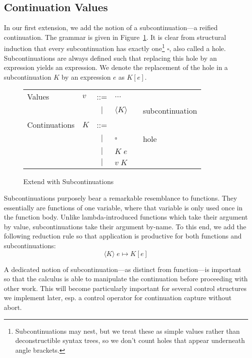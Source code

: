 \documentclass[11pt]{article}
\newcommand{\maybePage}{\newpage}
\newcommand{\angles}[1]{\langle#1\rangle}
\begin{document}
\maybePage
\subsection{Continuation Values}

In our first extension, we add the notion of a subcontinuation---a reified continuation.
The grammar is given in Figure~\ref{fig:addSubconts}.
It is clear from structural induction that every subcontinuation has exactly one\footnote{Subcontinuations may nest, but we treat these as simple values rather than deconstructible syntax trees, so we don't count holes that appear underneath angle brackets.} $\square$, also called a hole.
Subcontinuations are always defined such that replacing this hole by an expression yields an expression.
We denote the replacement of the hole in a subcontinuation $K$ by an expression $e$ as $K[e]$.

\begin{figure}[H]
\caption{Extend with Subcontinuations}
\label{fig:addSubconts}

\begin{tabular}{llclll}
Values & $v$ & ::= & $\ldots$ \\
& & $|$ & $\angles{K}$ && subcontinuation \\
Continuations & $K$ & ::= & \\
& & $|$ & $\square$ && hole \\
& & $|$ & $K\;e$ &&  \\
& & $|$ & $v\;K$ &&  \\

\end{tabular}
\end{figure}

Subcontinuations purposely bear a remarkable resemblance to functions.
They essentially are functions of one variable, where that variable is only used once in the function body.
Unlike lambda-introduced functions which take their argument by value, subcontinuations take their argument by-name.
To this end, we add the following reduction rule so that application is productive for both functions and subcontinuations:
$$\angles{K}\;e \mapsto K[e]$$

A dedicated notion of subcontinuation---as distinct from function---is important so that the calculus is able to manipulate the continuation before proceeding with other work.
This will become particularly important for several control structures we implement later, esp. a control operator for continuation capture without abort.
\end{document}
